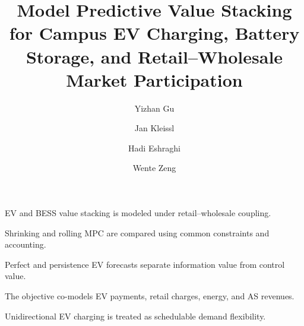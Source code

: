 \documentclass[final,5p,times]{elsarticle}
\begin{document}
\begin{frontmatter}

\title{Model Predictive Value Stacking for Campus EV Charging, Battery Storage, and Retail--Wholesale Market Participation}

\author[ucsd]{Yizhan Gu}
\author[ucsd]{Jan Kleissl}
\author[totalenergies]{Hadi Eshraghi}
\author[totalenergies]{Wente Zeng}



\begin{highlights}
\item EV and BESS value stacking is modeled under retail--wholesale coupling.
\item Shrinking and rolling MPC are compared using common constraints and accounting.
\item Perfect and persistence EV forecasts separate information value from control value.
\item The objective co-models EV payments, retail charges, energy, and AS revenues.
\item Unidirectional EV charging is treated as schedulable demand flexibility.
\end{highlights}


\end{frontmatter}
\end{document}
